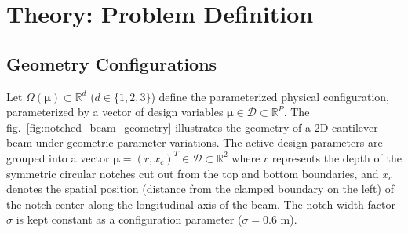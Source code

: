 \chapter{Theory: Problem Definition}
\label{ch:theory}

\section{Geometry Configurations}

Let $\Omega(\boldsymbol{\mu}) \subset \mathbb{R}^d$ ($d \in \{1, 2, 3\}$) define the parameterized physical configuration, parameterized by a vector of design variables $\boldsymbol{\mu} \in \mathcal{D} \subset \mathbb{R}^P$. The fig.~\ref{fig:notched_beam_geometry} illustrates the geometry of a 2D cantilever beam under geometric parameter variations. The active design parameters are grouped into a vector
$\boldsymbol{\mu} = (r, x_c)^T \in \mathcal{D} \subset \mathbb{R}^2$ where $r$ represents the depth of the symmetric circular notches cut out from the top and bottom boundaries, and $x_c$ denotes the spatial position (distance from the clamped boundary on the left) of the notch center along the longitudinal axis of the beam. The notch width factor $\sigma$ is kept constant as a configuration parameter ($\sigma = 0.6$ m).


